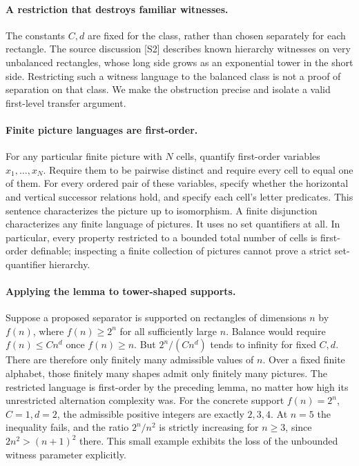 \documentclass[11pt,a4paper]{article}
\begin{document}
\paragraph{A restriction that destroys familiar witnesses.}
The constants $C,d$ are fixed for the class, rather than
chosen separately for each rectangle. The source discussion
[S2] describes known hierarchy witnesses on very unbalanced
rectangles, whose long side grows as an exponential tower
in the short side. Restricting such a witness language to
the balanced class is not a proof of separation on that
class. We make the obstruction precise and isolate a
valid first-level transfer argument.

\paragraph{Finite picture languages are first-order.}
For any particular finite picture with $N$ cells, quantify
first-order variables $x_1,\ldots,x_N$. Require them to be
pairwise distinct and require every cell to equal one of
them. For every ordered pair of these variables, specify
whether the horizontal and vertical successor relations
hold, and specify each cell's letter predicates. This
sentence characterizes the picture up to isomorphism.
A finite disjunction characterizes any finite language
of pictures. It uses no set quantifiers at all. In
particular, every property restricted to a bounded total
number of cells is first-order definable; inspecting a
finite collection of pictures cannot prove a strict
set-quantifier hierarchy.

\paragraph{Applying the lemma to tower-shaped supports.}
Suppose a proposed separator is supported on rectangles
of dimensions $n$ by $f(n)$, where $f(n)\ge2^n$ for
all sufficiently large $n$. Balance would require
$f(n)\le Cn^d$ once $f(n)\ge n$. But
$2^n/(Cn^d)$ tends to infinity for fixed $C,d$.
There are therefore only finitely many admissible values
of $n$. Over a fixed finite alphabet, those finitely many
shapes admit only finitely many pictures. The restricted
language is first-order by the preceding lemma, no matter
how high its unrestricted alternation complexity was.
For the concrete support $f(n)=2^n$, $C=1,d=2$,
the admissible positive integers are exactly $2,3,4$.
At $n=5$ the inequality fails, and the ratio $2^n/n^2$
is strictly increasing for $n\ge3$, since
$2n^2>(n+1)^2$ there. This small example exhibits the
loss of the unbounded witness parameter explicitly.
\end{document}
